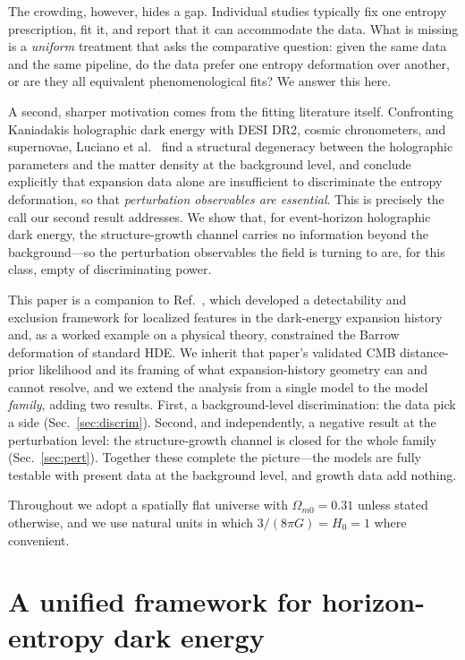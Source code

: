 \documentclass[twocolumn,10pt]{article}
\begin{document}
The crowding, however, hides a gap. Individual studies typically fix one
entropy prescription, fit it, and report that it can accommodate the data.
What is missing is a \emph{uniform} treatment that asks the comparative
question: given the same data and the same pipeline, do the data prefer one
entropy deformation over another, or are they all equivalent phenomenological
fits? We answer this here.

A second, sharper motivation comes from the fitting literature itself.
Confronting Kaniadakis holographic dark energy with DESI DR2, cosmic
chronometers, and supernovae, Luciano et al.~\cite{Luciano2025,Luciano2026}
find a structural degeneracy between the holographic parameters and the matter
density at the background level, and conclude explicitly that expansion data
alone are insufficient to discriminate the entropy deformation, so that
\emph{perturbation observables are essential}. This is precisely the call our
second result addresses. We show that, for event-horizon holographic dark
energy, the structure-growth channel carries no information beyond the
background---so the perturbation observables the field is turning to are, for
this class, empty of discriminating power.

This paper is a companion to Ref.~\cite{StepPaper}, which developed a
detectability and exclusion framework for localized features in the dark-energy
expansion history and, as a worked example on a physical theory, constrained
the Barrow deformation of standard HDE. We inherit that paper's validated
CMB distance-prior likelihood and its framing of what expansion-history
geometry can and cannot resolve, and we extend the analysis from a single
model to the model \emph{family}, adding two results. First, a background-level
discrimination: the data pick a side (Sec.~\ref{sec:discrim}). Second, and
independently, a negative result at the perturbation level: the structure-growth
channel is closed for the whole family (Sec.~\ref{sec:pert}). Together these
complete the picture---the models are fully testable with present data at the
background level, and growth data add nothing.

Throughout we adopt a spatially flat universe with
$\Omega_{m0}=0.31$ unless stated otherwise, and we use natural units in which
$3/(8\pi G)=H_0=1$ where convenient.

\section{A unified framework for horizon-entropy dark energy}
\label{sec:framework}
\end{document}
